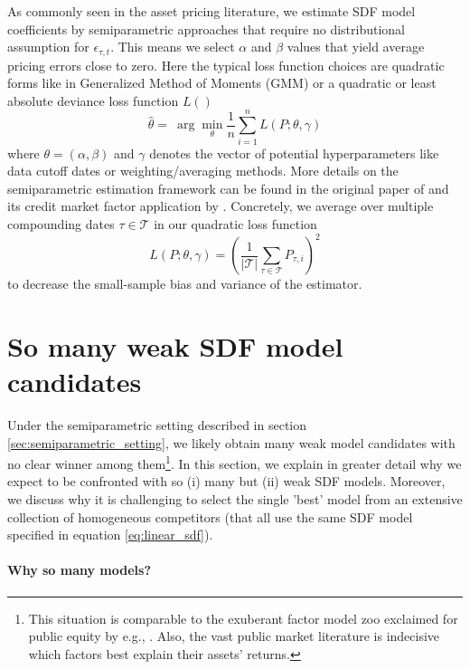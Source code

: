 \documentclass[12pt]{article}
\begin{document}
As commonly seen in the asset pricing literature, we estimate SDF model coefficients by semiparametric approaches that require no distributional assumption for $\epsilon_{\tau,t}$.
This means we select $\alpha$ and $\beta$ values that yield average pricing errors close to zero. 
Here the typical loss function choices are quadratic forms like in Generalized Method of Moments (GMM) or a quadratic or least absolute deviance loss function $L()$
\begin{equation}
\label{eq:elastic_net}
\hat{\theta } = \
\arg \min_{\theta} \frac{1}{n} \sum_{i=1}^n L \left( P ; \theta, \gamma \right)
\end{equation}
where $\theta=(\alpha,\beta)$ and $\gamma$ denotes the vector of potential hyperparameters like data cutoff dates or weighting/averaging methods.
More details on the semiparametric estimation framework can be found in the original paper of \cite{DLP12} and its credit market factor application by \cite{HSS23}.
Concretely, we average over multiple compounding dates $\tau \in \mathcal{T}$ in our quadratic loss function
\begin{equation}
	\label{eq:quadratic_loss}
	L \left( P ; \theta, \gamma \right) = \left( \frac{1}{|\mathcal{T}|} \sum_{\tau \in \mathcal{T}} P_{\tau,i}  \right)^2
\end{equation}
to decrease the small-sample bias and variance of the estimator.


\section{So many weak SDF model candidates}
\label{sec:model_selection}

Under the semiparametric setting described in section \ref{sec:semiparametric_setting}, we likely obtain many weak model candidates with no clear winner among them\footnote{This situation is comparable to the exuberant factor model zoo exclaimed for public equity by e.g., \cite{C11,FGX20}. Also, the vast public market literature is indecisive which factors best explain their assets' returns.}.
In this section, we explain in greater detail why we expect to be confronted with so (i) many but (ii) weak SDF models.
Moreover, we discuss why it is challenging to select the single 'best' model from an extensive collection of homogeneous competitors (that all use the same SDF model specified in equation \ref{eq:linear_sdf}).

\paragraph{Why so many models?}
\end{document}
